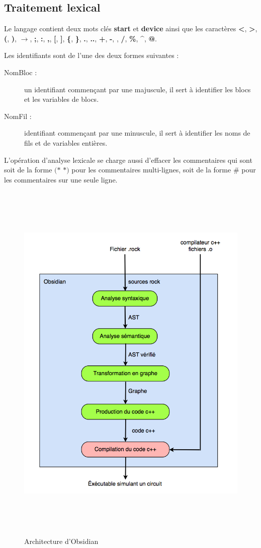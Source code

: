 \documentclass[13pt]{article}
\begin{document}
\subsection{Traitement lexical}
Le langage contient deux mots clés {\bf start} et {\bf device } ainsi que les
caractères {\bf <}, {\bf >}, {\bf (}, {\bf )}, {\bf $\to$}, {\bf ;}, {\bf :}, {\bf ,},
{\bf [}, {\bf ]}, {\bf \{}, {\bf \}}, {\bf .}, {\bf ..}, {\bf +}, {\bf -}, {\bf *}, {\bf /},
{\bf \%}, {\bf \^{}}, {\bf @}. 

Les identifiants sont de l'une des deux formes suivantes :
\begin{description}
\item[NomBloc : ] un identifiant commençant par une majuscule, il sert à
  identifier les blocs et les variables de blocs.
\item[NomFil : ] identifiant commençant par une minuscule, il sert à identifier
  les noms de fils et de variables entières.
\end{description}

L'opération d'analyse lexicale se charge aussi d'effacer les commentaires qui
sont soit de la forme \og $(*$\fg{} \og $*)$\fg{} pour les commentaires
multi-lignes, soit de la forme \og \#\fg{} pour les commentaires sur une seule ligne.

\begin{figure}
  \begin{center}
    \includegraphics[width=14.7cm,height=17.96cm]{obsidian.png}
    \caption{Architecture d'Obsidian}
    \label{Architecture d'Obsidian}
  \end{center}
\end{figure}
\end{document}
